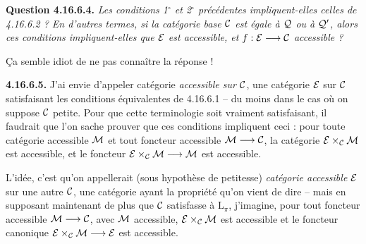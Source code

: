 \textbf{Question 4.16.6.4.} \textit{Les conditions 1$^\circ$ et 2$^\circ$ précédentes impliquent-elles celles de 4.16.6.2 ? En d'autres termes, si la catégorie base $\mathcal{C}$ est égale à $\mathcal{Q}$ ou à $\mathcal{Q}'$, alors ces conditions impliquent-elles que $\mathcal{E}$ est accessible, et $f : \mathcal{E} \longrightarrow \mathcal{C}$ accessible ?}

Ça semble idiot de ne pas connaître la réponse !

\textbf{4.16.6.5.} J'ai envie d'appeler catégorie \textit{accessible sur $\mathcal{C}$}, une catégorie $\mathcal{E}$ sur $\mathcal{C}$ satisfaisant les conditions équivalentes de 4.16.6.1 -- du moins dans le cas où on suppose $\mathcal{C}$ petite. Pour que cette terminologie soit vraiment satisfaisant, il faudrait que l'on sache prouver que ces conditions impliquent ceci : pour toute catégorie accessible $\mathcal{M}$ et tout foncteur accessible $\mathcal{M} \longrightarrow \mathcal{C}$, la catégorie $\mathcal{E} \times_{\mathcal{C}} \mathcal{M}$ est accessible, et le foncteur $\mathcal{E} \times_{\mathcal{C}} \mathcal{M} \longrightarrow \mathcal{M}$ est accessible. %

L'idée, c'est qu'on appellerait (sous hypothèse de petitesse) \textit{catégorie accessible $\mathcal{E}$} sur une autre $\mathcal{C}$, une catégorie ayant la propriété qu'on vient de dire -- mais en supposant maintenant de plus que $\mathcal{C}$ satisfasse à $\mathrm{L}_\pi$, j'imagine, pour tout foncteur accessible $\mathcal{M} \longrightarrow \mathcal{C}$, avec $\mathcal{M}$ accessible, $\mathcal{E} \times_{\mathcal{C}} \mathcal{M}$ est accessible et le foncteur canonique $\mathcal{E} \times_{\mathcal{C}} \mathcal{M} \longrightarrow \mathcal{E}$ est accessible.

